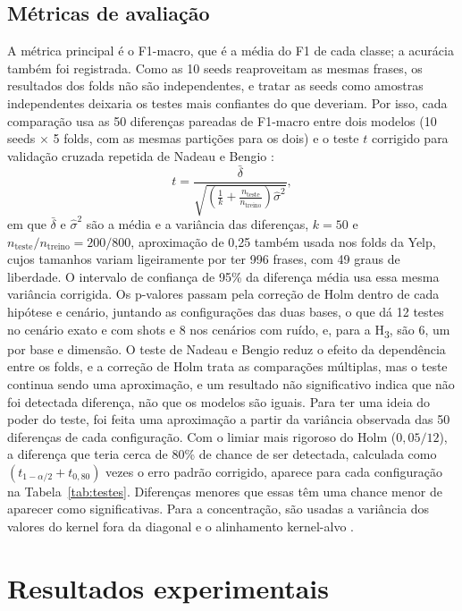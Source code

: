 \documentclass[conference]{IEEEtran}
\begin{document}
\subsection{Métricas de avaliação}
A métrica principal é o F1-macro, que é a média do F1 de cada classe; a acurácia também foi registrada. Como as 10 seeds reaproveitam as mesmas frases, os resultados dos folds não são independentes, e tratar as seeds como amostras independentes deixaria os testes mais confiantes do que deveriam. Por isso, cada comparação usa as 50 diferenças pareadas de F1-macro entre dois modelos (10 seeds $\times$ 5 folds, com as mesmas partições para os dois) e o teste $t$ corrigido para validação cruzada repetida de Nadeau e Bengio \cite{nadeau2003,bouckaert2004}:
\begin{equation}
t = \frac{\bar{\delta}}{\sqrt{\left(\frac{1}{k} + \frac{n_{\mathrm{teste}}}{n_{\mathrm{treino}}}\right)\hat{\sigma}^2}},
\end{equation}
em que $\bar{\delta}$ e $\hat{\sigma}^2$ são a média e a variância das diferenças, $k = 50$ e $n_{\mathrm{teste}}/n_{\mathrm{treino}} = 200/800$, aproximação de 0,25 também usada nos folds da Yelp, cujos tamanhos variam ligeiramente por ter 996 frases, com 49 graus de liberdade. O intervalo de confiança de 95\% da diferença média usa essa mesma variância corrigida. Os p-valores passam pela correção de Holm \cite{holm1979} dentro de cada hipótese e cenário, juntando as configurações das duas bases, o que dá 12 testes no cenário exato e com shots e 8 nos cenários com ruído, e, para a H\textsubscript{3}, são 6, um por base e dimensão. O teste de Nadeau e Bengio reduz o efeito da dependência entre os folds, e a correção de Holm trata as comparações múltiplas, mas o teste continua sendo uma aproximação, e um resultado não significativo indica que não foi detectada diferença, não que os modelos são iguais. Para ter uma ideia do poder do teste, foi feita uma aproximação a partir da variância observada das 50 diferenças de cada configuração. Com o limiar mais rigoroso do Holm ($0{,}05/12$), a diferença que teria cerca de 80\% de chance de ser detectada, calculada como $(t_{1-\alpha/2} + t_{0{,}80})$ vezes o erro padrão corrigido, aparece para cada configuração na Tabela~\ref{tab:testes}. Diferenças menores que essas têm uma chance menor de aparecer como significativas. Para a concentração, são usadas a variância dos valores do kernel fora da diagonal e o alinhamento kernel-alvo \cite{cristianini2001}.

\section{Resultados experimentais}
\label{sec:resultados}
\end{document}
